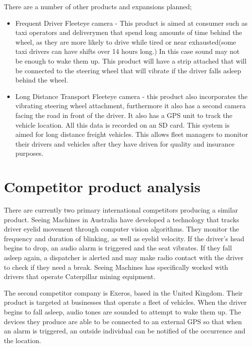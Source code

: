 There are a number of other products and expansions planned;
\begin{itemize}
	\item Frequent Driver Fleeteye camera - This product is aimed at consumer such as taxi operators and deliverymen that spend long amounts of time behind the wheel, as they are more likely to drive while tired or near exhausted(some taxi drivers can have shifts over 14 hours long\cite{taxiDriverHours}.) In this case sound may not be enough to wake them up. This product will have a strip attached that will be connected to the steering wheel that will vibrate if the driver falls asleep behind the wheel.
    \item Long Distance Transport Fleeteye camera - this product also incorporates the vibrating steering wheel attachment, furthermore it also has a second camera facing the road in front of the driver. It also has a GPS unit to track the vehicle location. All this data is recorded on an SD card. This system is aimed for long distance freight vehicles. This allows fleet managers to monitor their drivers and vehicles after they have driven for quality and insurance purposes.
\end{itemize}

\section{Competitor product analysis}
There are currently two primary international competitors producing a similar product. Seeing Machines in Australia have developed a technology that tracks driver eyelid movement through computer vision algorithms. They monitor the frequency and duration of blinking, as well as eyelid velocity. If the driver’s head begins to drop, an audio alarm is triggered and the seat vibrates. If they fall asleep again, a dispatcher is alerted and may make radio contact with the driver to check if they need a break. Seeing Machines has specifically worked with drivers that operate Caterpillar mining equipment.

The second competitor company is Exeros, based in the United Kingdom. Their product is targeted at businesses that operate a fleet of vehicles. When the driver begins to fall asleep, audio tones are sounded to attempt to wake them up. The devices they produce are able to be connected to an external GPS so that when an alarm is triggered, an outside individual can be notified of the occurrence and the location.


